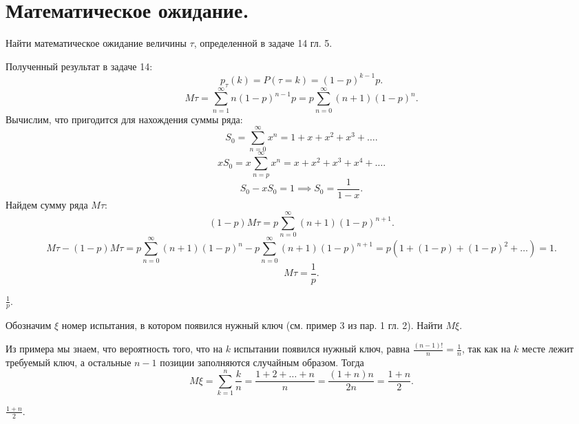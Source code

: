 
\section{Математическое ожидание.}

\begin{task}{1}
  Найти математическое ожидание величины $\tau$, определенной в задаче 14 гл. 5.
\end{task}

\begin{solution} Полученный результат в задаче 14:
\[
p_\tau(k) = P(\tau = k) = (1 - p)^{k - 1} p
.\] \[
M\tau = \sum_{n=1}^{\infty} n ( 1 - p)^{n - 1} p = p \sum_{n=0}^{\infty} (n + 1) (1 - p)^{n} 
.\] 
Вычислим, что пригодится для нахождения суммы ряда: \[
S_0 = \sum_{n=0}^{\infty} x^n = 1 + x + x^{2} + x^{3} + \dots
.\] 
\[
x S_0 = x \sum_{n=p}^{\infty} x^{n} = x + x^{2} + x^{3} + x^{4} + \dots
.\] 
\[
S_0 - xS_0 = 1 \implies S_0 = \frac{1}{1 - x}
.\] 
Найдем сумму ряда $M\tau$: \[
  (1 - p) M\tau = p \sum_{n=0}^{\infty} (n + 1)(1 - p)^{n + 1}
.\] 
\[
M\tau - (1 - p)M\tau = p \sum_{n=0}^{\infty} (n + 1) (1 - p)^{n} - p \sum_{n=0}^{\infty} (n + 1)(1 -
p)^{n + 1} = p \left(1 + (1 -p) + (1 - p)^{2} + \dots\right) = 1
.\] 
\[
M\tau = \frac{1}{p}
.\] 
\end{solution}

\begin{result}
$\frac{1}{p}$.
\end{result}
\medskip
\begin{task}{2}
  Обозначим $\xi$ номер испытания, в котором появился нужный ключ (см. пример 3 из пар. 1 гл. 2). Найти
  $M\xi$.
\end{task}

\begin{solution}
Из примера мы знаем, что вероятность того, что на $k$ испытании появился нужный ключ, равна
$\frac{(n- 1)!}{n} = \frac{1}{n}$, так как на $k$ месте лежит требуемый ключ, а остальные $n - 1$
позиции заполняются случайным образом. Тогда \[
M\xi = \sum_{k = 1}^{n} \frac{k}{n} = \frac{1 + 2 + \dots + n}{n} = \frac{\left(1 + n\right) n}{2n}
= \frac{1 + n}{2}
.\] 
\end{solution}

\begin{result}
$\frac{1 + n}{2}$.
\end{result}

